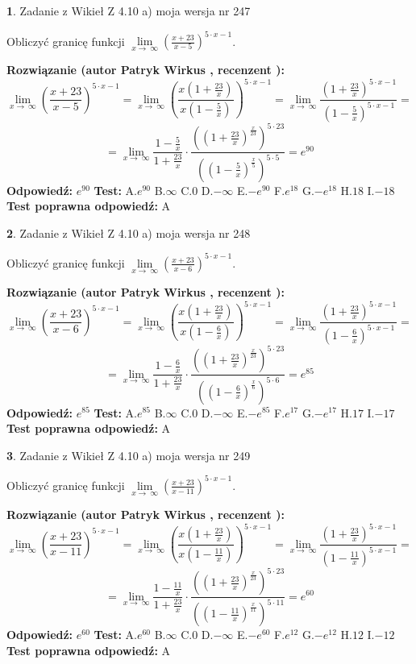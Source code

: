 \documentclass[12pt, a4paper]{article}
\theoremstyle{definition} %
\newtheorem{zad}{}
\newcommand{\zadStart}[1]{\begin{zad}#1\newline}
\newcommand{\zadStop}{\end{zad}}
\newcommand{\rozwStart}[2]{\noindent \textbf{Rozwiązanie (autor #1 , recenzent #2): }\newline}
\newcommand{\rozwStop}{\newline}
\newcommand{\odpStart}{\noindent \textbf{Odpowiedź:}\newline}
\newcommand{\odpStop}{\newline}
\newcommand{\testStart}{\noindent \textbf{Test:}\newline}
\newcommand{\testStop}{\newline}
\newcommand{\kluczStart}{\noindent \textbf{Test poprawna odpowiedź:}\newline}
\newcommand{\kluczStop}{\newline}
\begin{document}
\zadStart{Zadanie z Wikieł Z 4.10 a) moja wersja nr 247}

Obliczyć granicę funkcji  $\lim\limits_{x\to\ \infty}(\frac{x+23}{x-5})^{5\cdot x-1}$.
\zadStop
\rozwStart{Patryk Wirkus}{}
$$\lim\limits_{x\to\ \infty}(\frac{x+23}{x-5})^{5\cdot x-1} = \lim\limits_{x\to\ \infty}(\frac{x(1+\frac{23}{x})}{x(1-\frac{5}{x})})^{5\cdot x-1}=\lim\limits_{x\to\ \infty}\frac{(1+\frac{23}{x})^{5\cdot x-1}}{(1-\frac{5}{x})^{5\cdot x-1}}=$$
$$=\lim\limits_{x\to\ \infty}\frac{1-\frac{5}{x}}{1+\frac{23}{x}}\cdot\frac{((1+\frac{23}{x})^{\frac{x}{23}})^{5\cdot23}}{((1-\frac{5}{x})^{\frac{x}{5}})^{5\cdot5}}=e^{90}$$
\rozwStop
\odpStart
$e^{90}$
\odpStop
\testStart
A.$e^{90}$ B.$\infty$ C.$0$ D.$-\infty$ E.$-e^{90}$
F.$e^{18}$ G.$-e^{18}$
H.$18$
I.$-18$
\testStop
\kluczStart
A
\kluczStop



\zadStart{Zadanie z Wikieł Z 4.10 a) moja wersja nr 248}

Obliczyć granicę funkcji  $\lim\limits_{x\to\ \infty}(\frac{x+23}{x-6})^{5\cdot x-1}$.
\zadStop
\rozwStart{Patryk Wirkus}{}
$$\lim\limits_{x\to\ \infty}(\frac{x+23}{x-6})^{5\cdot x-1} = \lim\limits_{x\to\ \infty}(\frac{x(1+\frac{23}{x})}{x(1-\frac{6}{x})})^{5\cdot x-1}=\lim\limits_{x\to\ \infty}\frac{(1+\frac{23}{x})^{5\cdot x-1}}{(1-\frac{6}{x})^{5\cdot x-1}}=$$
$$=\lim\limits_{x\to\ \infty}\frac{1-\frac{6}{x}}{1+\frac{23}{x}}\cdot\frac{((1+\frac{23}{x})^{\frac{x}{23}})^{5\cdot23}}{((1-\frac{6}{x})^{\frac{x}{6}})^{5\cdot6}}=e^{85}$$
\rozwStop
\odpStart
$e^{85}$
\odpStop
\testStart
A.$e^{85}$ B.$\infty$ C.$0$ D.$-\infty$ E.$-e^{85}$
F.$e^{17}$ G.$-e^{17}$
H.$17$
I.$-17$
\testStop
\kluczStart
A
\kluczStop



\zadStart{Zadanie z Wikieł Z 4.10 a) moja wersja nr 249}

Obliczyć granicę funkcji  $\lim\limits_{x\to\ \infty}(\frac{x+23}{x-11})^{5\cdot x-1}$.
\zadStop
\rozwStart{Patryk Wirkus}{}
$$\lim\limits_{x\to\ \infty}(\frac{x+23}{x-11})^{5\cdot x-1} = \lim\limits_{x\to\ \infty}(\frac{x(1+\frac{23}{x})}{x(1-\frac{11}{x})})^{5\cdot x-1}=\lim\limits_{x\to\ \infty}\frac{(1+\frac{23}{x})^{5\cdot x-1}}{(1-\frac{11}{x})^{5\cdot x-1}}=$$
$$=\lim\limits_{x\to\ \infty}\frac{1-\frac{11}{x}}{1+\frac{23}{x}}\cdot\frac{((1+\frac{23}{x})^{\frac{x}{23}})^{5\cdot23}}{((1-\frac{11}{x})^{\frac{x}{11}})^{5\cdot11}}=e^{60}$$
\rozwStop
\odpStart
$e^{60}$
\odpStop
\testStart
A.$e^{60}$ B.$\infty$ C.$0$ D.$-\infty$ E.$-e^{60}$
F.$e^{12}$ G.$-e^{12}$
H.$12$
I.$-12$
\testStop
\kluczStart
A
\kluczStop
\end{document}
